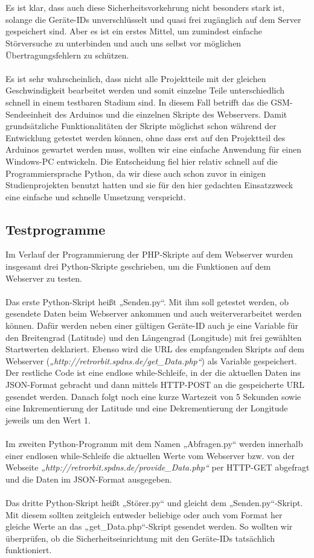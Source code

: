 \\
\\
Es ist klar, dass auch diese Sicherheitsvorkehrung nicht besonders stark ist, solange die Geräte-IDs unverschlüsselt und quasi frei zugänglich auf dem Server gespeichert sind. Aber es ist ein erstes Mittel, um zumindest einfache Störversuche zu unterbinden und auch uns selbst vor möglichen Übertragungsfehlern zu schützen.
\\
\\
Es ist sehr wahrscheinlich, dass nicht alle Projektteile mit der gleichen Geschwindigkeit bearbeitet werden und somit einzelne Teile unterschiedlich schnell in einem testbaren Stadium sind. In diesem Fall betrifft das die GSM-Sendeeinheit des Arduinos und die einzelnen Skripte des Webservers. Damit grundsätzliche Funktionalitäten der Skripte möglichst schon während der Entwicklung getestet werden können, ohne dass erst auf den Projektteil des Arduinos gewartet werden muss, wollten wir eine einfache Anwendung für einen Windows-PC entwickeln. Die Entscheidung fiel hier relativ schnell auf die Programmiersprache Python, da wir diese auch schon zuvor in einigen Studienprojekten benutzt hatten und sie für den hier gedachten Einsatzzweck eine einfache und schnelle Umsetzung verspricht.

\subsection{Testprogramme}
Im Verlauf der Programmierung der PHP-Skripte auf dem Webserver wurden insgesamt drei Python-Skripte geschrieben, um die Funktionen auf dem Webserver zu testen.
\\
\\
Das erste Python-Skript heißt „Senden.py“. Mit ihm soll getestet werden, ob gesendete Daten beim Webserver ankommen und auch weiterverarbeitet werden können. Dafür werden neben einer gültigen Geräte-ID auch je eine Variable für den Breitengrad (Latitude) und den Längengrad (Longitude) mit frei gewählten Startwerten deklariert. Ebenso wird die URL des empfangenden Skripts auf dem Webserver (\textit{„http://retrorbit.spdns.de/get\_Data.php“}) als Variable gespeichert. Der restliche Code ist eine endlose while-Schleife, in der die aktuellen Daten ins JSON-Format gebracht und dann mittels HTTP-POST an die gespeicherte URL gesendet werden. Danach folgt noch eine kurze Wartezeit von 5 Sekunden sowie eine Inkrementierung der Latitude und eine Dekrementierung der Longitude jeweils um den Wert 1.
\\
\\
Im zweiten Python-Programm mit dem Namen „Abfragen.py“ werden innerhalb einer endlosen while-Schleife die aktuellen Werte vom Webserver bzw. von der Webseite \textit{„http://retrorbit.spdns.de/provide\_Data.php“} per HTTP-GET abgefragt und die Daten im JSON-Format ausgegeben.
\\
\\
Das dritte Python-Skript heißt „Störer.py“ und gleicht dem „Senden.py“-Skript. Mit diesem sollten zeitgleich entweder beliebige oder auch vom Format her gleiche Werte an das „get\_Data.php“-Skript gesendet werden. So wollten wir überprüfen, ob die Sicherheitseinrichtung mit den Geräte-IDs tatsächlich funktioniert.

